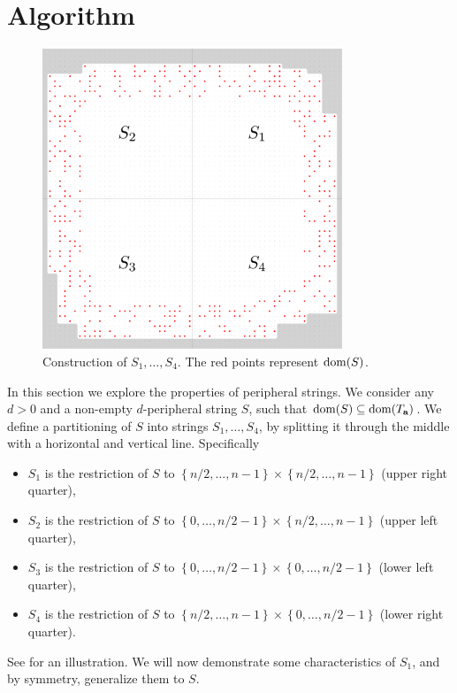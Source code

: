 \documentclass[11pt, letterpaper]{article}
\theoremstyle{plain}
\theoremstyle{definition}
\theoremstyle{remark}
\newcommand{\set}[1]{\left\lbrace #1 \right\rbrace}
\begin{document}
	
\section{Algorithm}
\label{sec:algorithm}

\begin{figure}[!t]
	\begin{center}
		\includegraphics[width=0.8\textwidth]{drawings/quarter_split}
	\end{center}
	\caption{Construction of $S_1, \dots, S_4$. The red points represent $\operatorname*{dom}(S)$.}
	\label{figure:quarter_split}
\end{figure}
In this section we explore the properties of peripheral strings.
We consider any $d > 0$ and a non-empty $d$-peripheral string $S$, such that $\operatorname*{dom}(S) \subseteq \operatorname*{dom}(T_\mathbf{a})$.
We define a partitioning of $S$ into strings $S_1, \dots, S_4$, by splitting it through the middle with a horizontal and vertical line. 
Specifically
\begin{itemize}
	\item $S_1$ is the restriction of $S$ to $\set{n / 2, \dots, n - 1} \times \set{n / 2, \dots, n - 1}$ (upper right quarter),
	\item $S_2$ is the restriction of $S$ to $\set{0, \dots, n / 2 - 1} \times \set{n / 2, \dots, n - 1}$ (upper left quarter),
	\item $S_3$ is the restriction of $S$ to $\set{0, \dots, n / 2 - 1} \times \set{0, \dots, n / 2 - 1}$ (lower left quarter),
	\item $S_4$ is the restriction of $S$ to $\set{n / 2, \dots, n - 1} \times \set{0, \dots, n / 2 - 1}$ (lower right quarter).
\end{itemize}
See  for an illustration.
We will now demonstrate some characteristics of $S_1$, and by symmetry, generalize them to $S$.
\end{document}
